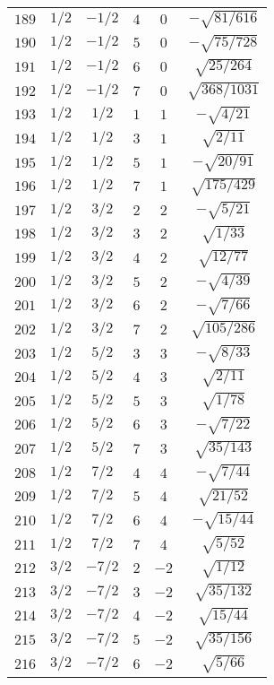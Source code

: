\begin{table}
\begin{center}
\begin{tabular}{|c|c|c|c|c|c|}
$189$ & $1/2$ & $-1/2$ & $4$ & $0$ & $-\sqrt{81/616}$ \\ 
$190$ & $1/2$ & $-1/2$ & $5$ & $0$ & $-\sqrt{75/728}$ \\ 
$191$ & $1/2$ & $-1/2$ & $6$ & $0$ & $\sqrt{25/264}$ \\ 
$192$ & $1/2$ & $-1/2$ & $7$ & $0$ & $\sqrt{368/1031}$ \\ 
$193$ & $1/2$ & $1/2$ & $1$ & $1$ & $-\sqrt{4/21}$ \\ 
$194$ & $1/2$ & $1/2$ & $3$ & $1$ & $\sqrt{2/11}$ \\ 
$195$ & $1/2$ & $1/2$ & $5$ & $1$ & $-\sqrt{20/91}$ \\ 
$196$ & $1/2$ & $1/2$ & $7$ & $1$ & $\sqrt{175/429}$ \\ 
$197$ & $1/2$ & $3/2$ & $2$ & $2$ & $-\sqrt{5/21}$ \\ 
$198$ & $1/2$ & $3/2$ & $3$ & $2$ & $\sqrt{1/33}$ \\ 
$199$ & $1/2$ & $3/2$ & $4$ & $2$ & $\sqrt{12/77}$ \\ 
$200$ & $1/2$ & $3/2$ & $5$ & $2$ & $-\sqrt{4/39}$ \\ 
$201$ & $1/2$ & $3/2$ & $6$ & $2$ & $-\sqrt{7/66}$ \\ 
$202$ & $1/2$ & $3/2$ & $7$ & $2$ & $\sqrt{105/286}$ \\ 
$203$ & $1/2$ & $5/2$ & $3$ & $3$ & $-\sqrt{8/33}$ \\ 
$204$ & $1/2$ & $5/2$ & $4$ & $3$ & $\sqrt{2/11}$ \\ 
$205$ & $1/2$ & $5/2$ & $5$ & $3$ & $\sqrt{1/78}$ \\ 
$206$ & $1/2$ & $5/2$ & $6$ & $3$ & $-\sqrt{7/22}$ \\ 
$207$ & $1/2$ & $5/2$ & $7$ & $3$ & $\sqrt{35/143}$ \\ 
$208$ & $1/2$ & $7/2$ & $4$ & $4$ & $-\sqrt{7/44}$ \\ 
$209$ & $1/2$ & $7/2$ & $5$ & $4$ & $\sqrt{21/52}$ \\ 
$210$ & $1/2$ & $7/2$ & $6$ & $4$ & $-\sqrt{15/44}$ \\ 
$211$ & $1/2$ & $7/2$ & $7$ & $4$ & $\sqrt{5/52}$ \\ 
$212$ & $3/2$ & $-7/2$ & $2$ & $-2$ & $\sqrt{1/12}$ \\ 
$213$ & $3/2$ & $-7/2$ & $3$ & $-2$ & $\sqrt{35/132}$ \\ 
$214$ & $3/2$ & $-7/2$ & $4$ & $-2$ & $\sqrt{15/44}$ \\ 
$215$ & $3/2$ & $-7/2$ & $5$ & $-2$ & $\sqrt{35/156}$ \\ 
$216$ & $3/2$ & $-7/2$ & $6$ & $-2$ & $\sqrt{5/66}$ \\ 

\end{tabular}
\end{center}
\end{table}
